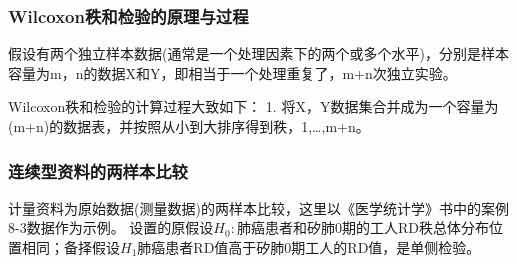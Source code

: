\documentclass[
]{article}
\begin{document}
\hypertarget{wilcoxonux79e9ux548cux68c0ux9a8cux7684ux539fux7406ux4e0eux8fc7ux7a0b}{%
\subsubsection{Wilcoxon秩和检验的原理与过程}\label{wilcoxonux79e9ux548cux68c0ux9a8cux7684ux539fux7406ux4e0eux8fc7ux7a0b}}

假设有两个独立样本数据(通常是一个处理因素下的两个或多个水平)，分别是样本容量为m，n的数据X和Y，即相当于一个处理重复了，m+n次独立实验。

Wilcoxon秩和检验的计算过程大致如下：
1. 将X，Y数据集合并成为一个容量为(m+n)的数据表，并按照从小到大排序得到秩，1,\ldots,m+n。

\hypertarget{ux8fdeux7eedux578bux8d44ux6599ux7684ux4e24ux6837ux672cux6bd4ux8f83}{%
\subsubsection{连续型资料的两样本比较}\label{ux8fdeux7eedux578bux8d44ux6599ux7684ux4e24ux6837ux672cux6bd4ux8f83}}

计量资料为原始数据(测量数据)的两样本比较，这里以《医学统计学》书中的案例8-3数据作为示例。
设置的原假设\(H_0:\)肺癌患者和矽肺0期的工人RD秩总体分布位置相同；备择假设\(H_1\)肺癌患者RD值高于矽肺0期工人的RD值，是单侧检验。
\end{document}
